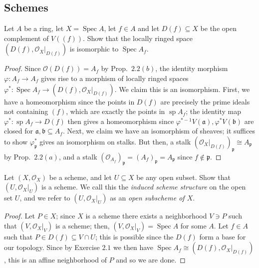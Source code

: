 \documentclass[10pt]{article}
\theoremstyle{definition}
\theoremstyle{remark}
\numberwithin{equation}{section}
\numberwithin{figure}{subsubsection}
\DeclareMathOperator{\Spec}{Spec}
\DeclareMathOperator{\Sp}{sp}
\newcommand{\OO}{\mathcal{O}}
\begin{document}
\subsection{Schemes}
\begin{problem}
  Let $A$ be a ring, let $X = \Spec A$, let $f \in A$ and let $D(f) \subseteq X$ be the open complement of $V((f))$. Show that the locally ringed space $(D(f),\OO_X\vert_{D(f)})$ is isomorphic to $\Spec A_f$.
\end{problem}
\begin{proof}
  Since $\OO(D(f)) = A_f$ by Prop.~$2.2(b)$, the identity morphism $\varphi\colon A_f \to A_f$ gives rise to a morphism of locally ringed spaces $\varphi^*\colon\Spec A_f \to (D(f),\OO_X\vert_{D(f)})$. We claim this is an isomorphism. First, we have a homeomorphism since the points in $D(f)$ are precisely the prime ideals not containing $(f)$, which are exactly the points in $\Sp A_f$; the identity map $\varphi^*\colon\Sp A_f \to D(f)$ then gives a homeomorphism since $\varphi^{*-1}V(\mathfrak{a}),\varphi^*V(\mathfrak{b})$ are closed for $\mathfrak{a},\mathfrak{b} \subseteq A_f$. Next, we claim we have an isomorphism of sheaves; it suffices to show $\varphi^*_\mathfrak{p}$ gives an isomorphism on stalks. But then, a stalk $(\OO_X\vert_{D(f)})_\mathfrak{p} \cong A_{\mathfrak{p}}$ by Prop.~$2.2(a)$, and a stalk $(\OO_{A_f})_\mathfrak{p} = (A_f)_\mathfrak{p} = A_\mathfrak{p}$ since $f \notin \mathfrak{p}$.
\end{proof}

\begin{problem}
  Let $(X,\OO_X)$ be a scheme, and let $U \subseteq X$ be any open subset. Show that $(U,\OO_X\vert_U)$ is a scheme. We call this the \emph{induced scheme structure} on the open set $U$, and we refer to $(U,\OO_X\vert_U)$ as an \emph{open subscheme of $X$}.
\end{problem}
\begin{proof}
  Let $P \in X$; since $X$ is a scheme there exists a neighborhood $V \ni P$
  such that $(V,\OO_X\vert_V)$ is a scheme; then, $(V,\OO_X\vert_V) = \Spec A$
  for some $A$. Let $f \in A$ such that $P \in D(f) \subseteq V \cap U$; this is
  possible since the $D(f)$ form a base for our topology. Since by Exercise $2.1$ we then have $\Spec A_f \cong (D(f),\OO_X\vert_{D(f)})$, this is an affine neighborhood of $P$ and so we are done.
\end{proof}
\end{document}
